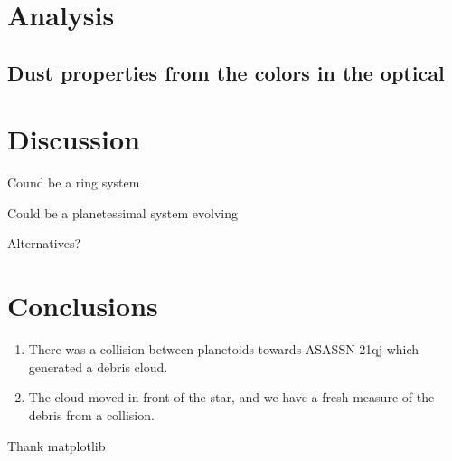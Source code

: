 \documentclass{aa}
\begin{document}
\section{Analysis}\label{sec:dustcloud}

\subsection{Dust properties from the colors in the optical}

\section{Discussion}\label{sec:discussion}

Cound be a ring system

Could be a planetessimal system evolving

Alternatives?

\section{Conclusions}\label{sec:conclusion}

   \begin{enumerate}
      \item There was a collision between planetoids towards ASASSN-21qj which generated a debris cloud.
      \item The cloud moved in front of the star, and we have a fresh measure of the debris from a collision.
   \end{enumerate}

\begin{acknowledgements}
Thank matplotlib

\end{acknowledgements}



\end{document}
